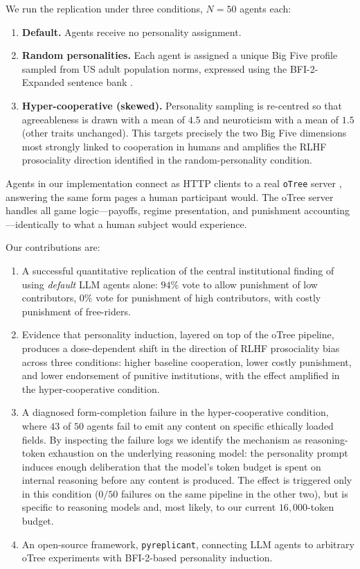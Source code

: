 \documentclass[12pt, a4paper]{article}
\begin{document}
We run the replication under three conditions, $N=50$ agents each:
\begin{enumerate}
  \item \textbf{Default.} Agents receive no personality assignment.
  \item \textbf{Random personalities.} Each agent is assigned a unique Big Five profile sampled from US adult population norms, expressed using the BFI-2-Expanded sentence bank \citep{soto2017bfi2}.
  \item \textbf{Hyper-cooperative (skewed).} Personality sampling is re-centred so that agreeableness is drawn with a mean of $4.5$ and neuroticism with a mean of $1.5$ (other traits unchanged). This targets precisely the two Big Five dimensions most strongly linked to cooperation in humans \citep{volk2012personality} and amplifies the RLHF prosociality direction identified in the random-personality condition.
\end{enumerate}

Agents in our implementation connect as HTTP clients to a real \texttt{oTree} server \citep{otree}, answering the same form pages a human participant would. The oTree server handles all game logic---payoffs, regime presentation, and punishment accounting---identically to what a human subject would experience.

Our contributions are:
\begin{enumerate}
  \item A successful quantitative replication of the central institutional finding of \citet{ertan2009who} using \emph{default} LLM agents alone: $94\%$ vote to allow punishment of low contributors, $0\%$ vote for punishment of high contributors, with costly punishment of free-riders.
  \item Evidence that personality induction, layered on top of the oTree pipeline, produces a dose-dependent shift in the direction of RLHF prosociality bias across three conditions: higher baseline cooperation, lower costly punishment, and lower endorsement of punitive institutions, with the effect amplified in the hyper-cooperative condition.
  \item A diagnosed form-completion failure in the hyper-cooperative condition, where $43$ of $50$ agents fail to emit any content on specific ethically loaded fields. By inspecting the failure logs we identify the mechanism as reasoning-token exhaustion on the underlying reasoning model: the personality prompt induces enough deliberation that the model's token budget is spent on internal reasoning before any content is produced. The effect is triggered only in this condition ($0/50$ failures on the same pipeline in the other two), but is specific to reasoning models and, most likely, to our current $16{,}000$-token budget.
  \item An open-source framework, \texttt{pyreplicant}, connecting LLM agents to arbitrary oTree experiments with BFI-2-based personality induction.
\end{enumerate}
\end{document}
